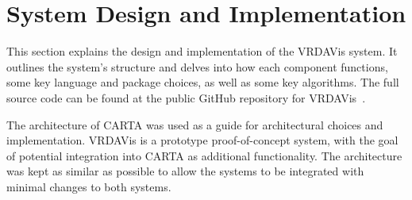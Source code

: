 \section{System Design and Implementation}
\label{sec:system-design}






This section explains the design and implementation of the VRDAVis system. 
It outlines the system's structure and delves into how each component functions, some key language and package choices, as well as some key algorithms. 
The full source code can be found at the public GitHub repository for VRDAVis~\cite{VRDAVisGitHub}.

The architecture of CARTA was used as a guide for architectural choices and implementation. 
VRDAVis is a prototype proof-of-concept system, with the goal of potential integration into CARTA as additional functionality. 
The architecture was kept as similar as possible to allow the systems to be integrated with minimal changes to both systems.

